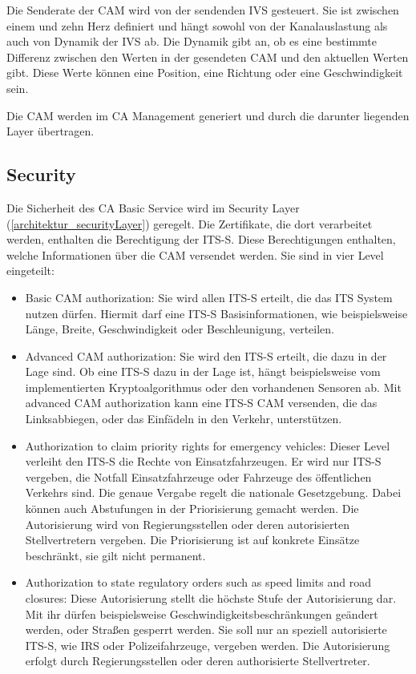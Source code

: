 Die Senderate der \ac{CAM} wird von der sendenden \ac{IVS} gesteuert. Sie ist zwischen einem und zehn Herz definiert und hängt sowohl von der Kanalauslastung als auch von Dynamik der \ac{IVS} ab. Die Dynamik gibt an, ob es eine bestimmte Differenz zwischen den Werten in der gesendeten \ac{CAM} und den aktuellen Werten gibt. Diese Werte können eine Position, eine Richtung oder eine Geschwindigkeit sein.

Die \ac{CAM} werden im \ac{CA} Management generiert und durch die darunter liegenden Layer übertragen.

\subsection{Security \label{facilitylayer_CAM-Security}}
Die Sicherheit des \ac{CA} Basic Service wird im Security Layer (\autoref{architektur_securityLayer}) geregelt. Die Zertifikate, die dort verarbeitet werden, enthalten die Berechtigung der \ac{ITS-S}. Diese Berechtigungen enthalten, welche Informationen über die \ac{CAM} versendet werden. Sie sind in vier Level eingeteilt:
\begin{itemize}
	\item Basic \ac{CAM} authorization: Sie wird allen \ac{ITS-S} erteilt, die das \ac{ITS} System nutzen dürfen. Hiermit darf eine \ac{ITS-S} Basisinformationen, wie beispielsweise Länge, Breite, Geschwindigkeit oder Beschleunigung, verteilen. 
	\item Advanced \ac{CAM} authorization: Sie wird den \ac{ITS-S} erteilt, die dazu in der Lage sind. Ob eine \ac{ITS-S} dazu in der Lage ist, hängt beispielsweise vom implementierten Kryptoalgorithmus oder den vorhandenen Sensoren ab. Mit advanced \ac{CAM} authorization kann eine \ac{ITS-S} \ac{CAM} versenden, die das Linksabbiegen, oder das Einfädeln in den Verkehr, unterstützen.
	\item Authorization to claim priority rights for emergency vehicles: Dieser Level verleiht den \ac{ITS-S} die Rechte von Einsatzfahrzeugen. Er wird nur \ac{ITS-S} vergeben, die Notfall Einsatzfahrzeuge oder Fahrzeuge des öffentlichen Verkehrs sind. Die genaue Vergabe regelt die  nationale Gesetzgebung.  Dabei können auch Abstufungen in der Priorisierung gemacht werden. Die Autorisierung wird von Regierungsstellen oder deren autorisierten Stellvertretern vergeben. Die Priorisierung ist  auf konkrete Einsätze beschränkt, sie gilt nicht permanent.
	\item Authorization to state regulatory orders such as speed limits and road closures: Diese Autorisierung stellt die höchste Stufe der Autorisierung dar. Mit ihr dürfen beispielsweise Geschwindigkeitsbeschränkungen geändert werden, oder Straßen gesperrt werden. Sie soll nur an speziell autorisierte \ac{ITS-S}, wie \ac{IRS} oder Polizeifahrzeuge, vergeben werden. Die Autorisierung erfolgt durch Regierungsstellen oder deren authorisierte Stellvertreter. 
\end{itemize}
 
